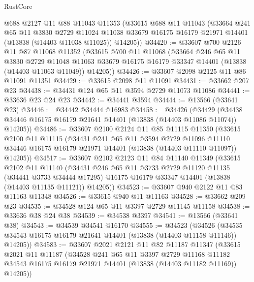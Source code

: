 \begin{lexlean}{RustCore}
\begin{coremodule}
    @688
    @2127
    @11
    @88
    @11043
    @11353
    (@33615
      @688
      @11
      @11043
      (@33664
        @241
        @65
        @11
        @3830
        @2729
        @11024
        @11038
        @33679
        @16175
        @16179
        @21971
        @14401
        (@13838 (@14403 @11038 @11025))
        @14205))
@34420 := @33607
    @700
    @2126
    @11
    @87
    @11068
    @11352
    (@33615
      @700
      @11
      @11068
      (@33664
        @246
        @65
        @11
        @3830
        @2729
        @11048
        @11063
        @33679
        @16175
        @16179
        @33347
        @14401
        (@13838 (@14403 @11063 @11049))
        @14205))
@34426 := @33607 @2098 @2125 @11 @86 @11091 @11351
@34429 := @33615 @2098 @11 @11091
@34431 := @33662 @207 @23
@34438 := @34431 @124 @65 @11 @3594 @2729 @11073 @11086
@34441 := @33636 @23 @24 @23
@34442 := @34441 @3594
@34444 := @13566 (@33641 @23)
@34446 := @34442 @34444 @16983
@34458 := @34426
    (@34429 (@34438 @34446 @16175 @16179 @21641 @14401 (@13838 (@14403 @11086 @11074)) @14205))
@34486 := @33607
    @2100
    @2124
    @11
    @85
    @11115
    @11350
    (@33615
      @2100
      @11
      @11115
      (@34431
        @241
        @65
        @11
        @3594
        @2729
        @11096
        @11110
        @34446
        @16175
        @16179
        @21971
        @14401
        (@13838 (@14403 @11110 @11097))
        @14205))
@34517 := @33607
    @2102
    @2123
    @11
    @84
    @11140
    @11349
    (@33615
      @2102
      @11
      @11140
      (@34431
        @246
        @65
        @11
        @3733
        @2729
        @11120
        @11135
        (@34441 @3733 @34444 @17295)
        @16175
        @16179
        @33347
        @14401
        (@13838 (@14403 @11135 @11121))
        @14205))
@34523 := @33607 @940 @2122 @11 @83 @11163 @11348
@34526 := @33615 @940 @11 @11163
@34528 := @33662 @209 @23
@34535 := @34528 @124 @65 @11 @3397 @2729 @11145 @11158
@34538 := @33636 @38 @24 @38
@34539 := @34538 @3397
@34541 := @13566 (@33641 @38)
@34543 := @34539 @34541 @16170
@34555 := @34523
    (@34526 (@34535 @34543 @16175 @16179 @21641 @14401 (@13838 (@14403 @11158 @11146)) @14205))
@34583 := @33607
    @2021
    @2121
    @11
    @82
    @11187
    @11347
    (@33615
      @2021
      @11
      @11187
      (@34528
        @241
        @65
        @11
        @3397
        @2729
        @11168
        @11182
        @34543
        @16175
        @16179
        @21971
        @14401
        (@13838 (@14403 @11182 @11169))
        @14205))

\end{coremodule}
\end{lexlean}
